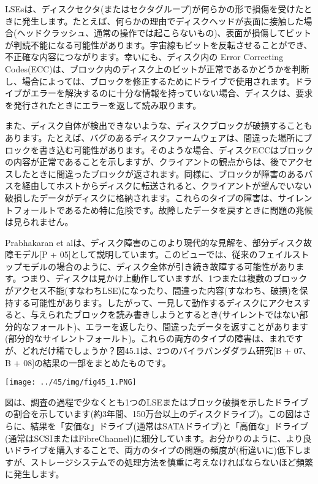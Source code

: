LSEsは、ディスクセクタ(またはセクタグループ)が何らかの形で損傷を受けたときに発生します。たとえば、何らかの理由でディスクヘッドが表面に接触した場合(ヘッドクラッシュ、通常の操作では起こらないもの)、表面が損傷してビットが判読不能になる可能性があります。宇宙線もビットを反転させることができ、不正確な内容につながります。幸いにも、ディスク内の
Error Correcting
Codes(ECC)は、ブロック内のディスク上のビットが正常であるかどうかを判断し、場合によっては、ブロックを修正するためにドライブで使用されます。ドライブがエラーを解決するのに十分な情報を持っていない場合、ディスクは、要求を発行されたときにエラーを返して読み取ります。

また、ディスク自体が検出できないような、ディスクブロックが破損することもあります。たとえば、バグのあるディスクファームウェアは、間違った場所にブロックを書き込む可能性があります。そのような場合、ディスクECCはブロックの内容が正常であることを示しますが、クライアントの観点からは、後でアクセスしたときに間違ったブロックが返されます。同様に、ブロックが障害のあるバスを経由してホストからディスクに転送されると、クライアントが望んでいない破損したデータがディスクに格納されます。これらのタイプの障害は、サイレントフォールトであるため特に危険です。故障したデータを戻すときに問題の兆候は見られません。

Prabhakaran et
alは、ディスク障害のこのより現代的な見解を、部分ディスク故障モデル{[}P +
05{]}として説明しています。このビューでは、従来のフェイルストップモデルの場合のように、ディスク全体が引き続き故障する可能性があります。つまり、ディスクは見かけ上動作していますが、1つまたは複数のブロックがアクセス不能(すなわちLSE)になったり、間違った内容(すなわち、破損)を保持する可能性があります。したがって、一見して動作するディスクにアクセスすると、与えられたブロックを読み書きしようとするとき(サイレントではない部分的なフォールト)、エラーを返したり、間違ったデータを返すことがあります(部分的なサイレントフォールト)。これらの両方のタイプの障害は、まれですが、どれだけ稀でしょうか？図45.1は、2つのバイラバンダダラム研究{[}B
+ 07、B + 08{]}の結果の一部をまとめたものです。

\texttt{[image: ../45/img/fig45\_1.PNG]}

図は、調査の過程で少なくとも1つのLSEまたはブロック破損を示したドライブの割合を示しています(約3年間、150万台以上のディスクドライブ)。この図はさらに、結果を「安価な」ドライブ(通常はSATAドライブ)と「高価な」ドライブ(通常はSCSIまたはFibreChannel)に細分しています。お分かりのように、より良いドライブを購入することで、両方のタイプの問題の頻度が(桁違いに)低下しますが、ストレージシステムでの処理方法を慎重に考えなければならないほど頻繁に発生します。

